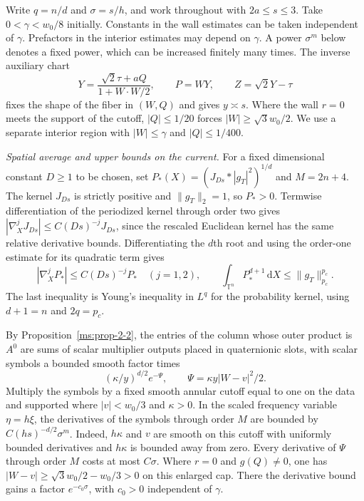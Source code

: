 Write $q=n/d$ and $\sigma=s/h$, and work throughout with $2a\le s\le3$. Take $0<\gamma<w_0/8$ initially. Constants in the wall estimates can be taken independent of $\gamma$. Prefactors in the interior estimates may depend on $\gamma$. A power $\sigma^m$ below denotes a fixed power, which can be increased finitely many times. The inverse auxiliary chart
\[
Y=\frac{\sqrt2\tau+aQ}{1+W\cdot W/2},\qquad P=WY,\qquad Z=\sqrt2Y-\tau
\]
fixes the shape of the fiber in $(W,Q)$ and gives $y\asymp s$. Where the wall $r=0$ meets the support of the cutoff, $|Q|\le1/20$ forces $|W|\ge\sqrt3w_0/2$. We use a separate interior region with $|W|\le\gamma$ and $|Q|\le1/400$.

\smallskip
\noindent\textit{Spatial average and upper bounds on the current.}
For a fixed dimensional constant $D\ge1$ to be chosen, set $P_*(X)=(J_{Ds}*|g_T|^2)^{1/d}$ and $M=2n+4$. The kernel $J_{Ds}$ is strictly positive and $\|g_T\|_2=1$, so $P_*>0$. Termwise differentiation of the periodized kernel through order two gives $|\nabla_X^j J_{Ds}|\le C(Ds)^{-j}J_{Ds}$, since the rescaled Euclidean kernel has the same relative derivative bounds. Differentiating the $d$th root and using the order-one estimate for its quadratic term gives
\[
|\nabla_X^j P_*|\le C(Ds)^{-j}P_*\quad(j=1,2),\qquad
\int_{\mathbb T^n}P_*^{d+1}\,\mathrm dX\le\|g_T\|_{p_c}^{p_c}.
\]
The last inequality is Young's inequality in $L^q$ for the probability kernel, using $d+1=n$ and $2q=p_c$.

By Proposition~\ref{ms:prop-2-2}, the entries of the column whose outer product is $A^0$ are sums of scalar multiplier outputs placed in quaternionic slots, with scalar symbols a bounded smooth factor times
\[
(\kappa/y)^{d/2}e^{-\Psi},\qquad \Psi=\kappa y|W-v|^2/2.
\]
Multiply the symbols by a fixed smooth annular cutoff equal to one on the data and supported where $|v|<w_0/3$ and $\kappa>0$. In the scaled frequency variable $\eta=h\xi$, the derivatives of the symbols through order $M$ are bounded by $C(hs)^{-d/2}\sigma^m$. Indeed, $h\kappa$ and $v$ are smooth on this cutoff with uniformly bounded derivatives and $h\kappa$ is bounded away from zero. Every derivative of $\Psi$ through order $M$ costs at most $C\sigma$. Where $r=0$ and $g(Q)\ne0$, one has $|W-v|\ge\sqrt3w_0/2-w_0/3>0$ on this enlarged cap. There the derivative bound gains a factor $e^{-c_0\sigma}$, with $c_0>0$ independent of $\gamma$.


